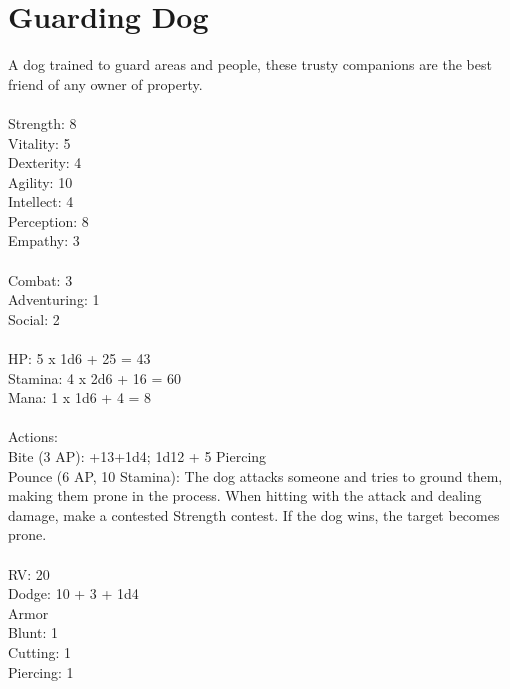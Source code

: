 \section{Guarding Dog}

A dog trained to guard areas and people, these trusty companions are the best friend of any owner of property.\\
\\
Strength: 8\\
Vitality: 5\\
Dexterity: 4\\
Agility: 10\\
Intellect: 4\\
Perception: 8\\
Empathy: 3\\
\\
Combat: 3\\
Adventuring: 1\\
Social: 2\\
\\
HP: 5 x 1d6 + 25 = 43\\
Stamina: 4 x 2d6 + 16 = 60\\
Mana: 1 x 1d6 + 4 = 8\\
\\
Actions:\\
Bite (3 AP): +13+1d4; 1d12 + 5 Piercing\\
Pounce (6 AP, 10 Stamina): The dog attacks someone and tries to ground them, making them prone in the process. When hitting with the attack and dealing damage, make a contested Strength contest. If the dog wins, the target becomes prone.\\
\\
RV: 20\\
Dodge: 10 + 3 + 1d4\\
Armor\\
Blunt: 1\\
Cutting: 1\\
Piercing: 1\\
